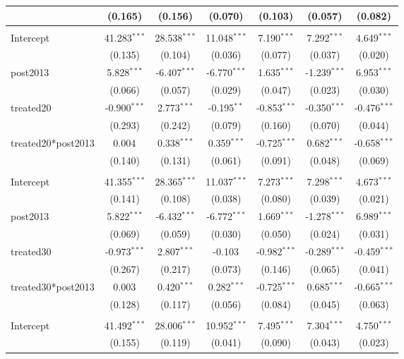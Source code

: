 \documentclass[12pt]{article}
\begin{document}
\begin{table}[!htbp]
\begin{tabular}{@{\extracolsep{5pt}}lcccccc}
  & (0.165) & (0.156) & (0.070) & (0.103) & (0.057) & (0.082) \\
\hline \\[-1.8ex]
 Intercept & 41.283$^{***}$ & 28.538$^{***}$ & 11.048$^{***}$ & 7.190$^{***}$ & 7.292$^{***}$ & 4.649$^{***}$ \\
  & (0.135) & (0.104) & (0.036) & (0.077) & (0.037) & (0.020) \\
 post2013 & 5.828$^{***}$ & -6.407$^{***}$ & -6.770$^{***}$ & 1.635$^{***}$ & -1.239$^{***}$ & 6.953$^{***}$ \\
  & (0.066) & (0.057) & (0.029) & (0.047) & (0.023) & (0.030) \\
 treated20 & -0.900$^{***}$ & 2.773$^{***}$ & -0.195$^{**}$ & -0.853$^{***}$ & -0.350$^{***}$ & -0.476$^{***}$ \\
  & (0.293) & (0.242) & (0.079) & (0.160) & (0.070) & (0.044) \\
 treated20*post2013 & 0.004$^{}$ & 0.338$^{***}$ & 0.359$^{***}$ & -0.725$^{***}$ & 0.682$^{***}$ & -0.658$^{***}$ \\
  & (0.140) & (0.131) & (0.061) & (0.091) & (0.048) & (0.069) \\
\hline \\[-1.8ex]
 Intercept & 41.355$^{***}$ & 28.365$^{***}$ & 11.037$^{***}$ & 7.273$^{***}$ & 7.298$^{***}$ & 4.673$^{***}$ \\
  & (0.141) & (0.108) & (0.038) & (0.080) & (0.039) & (0.021) \\
 post2013 & 5.822$^{***}$ & -6.432$^{***}$ & -6.772$^{***}$ & 1.669$^{***}$ & -1.278$^{***}$ & 6.989$^{***}$ \\
  & (0.069) & (0.059) & (0.030) & (0.050) & (0.024) & (0.031) \\
 treated30 & -0.973$^{***}$ & 2.807$^{***}$ & -0.103$^{}$ & -0.982$^{***}$ & -0.289$^{***}$ & -0.459$^{***}$ \\
  & (0.267) & (0.217) & (0.073) & (0.146) & (0.065) & (0.041) \\
 treated30*post2013 & 0.003$^{}$ & 0.420$^{***}$ & 0.282$^{***}$ & -0.725$^{***}$ & 0.685$^{***}$ & -0.665$^{***}$ \\
  & (0.128) & (0.117) & (0.056) & (0.084) & (0.045) & (0.063) \\
\hline \\[-1.8ex]
 Intercept & 41.492$^{***}$ & 28.006$^{***}$ & 10.952$^{***}$ & 7.495$^{***}$ & 7.304$^{***}$ & 4.750$^{***}$ \\
  & (0.155) & (0.119) & (0.041) & (0.090) & (0.043) & (0.023) \\

\end{tabular}
\end{table}
\end{document}
